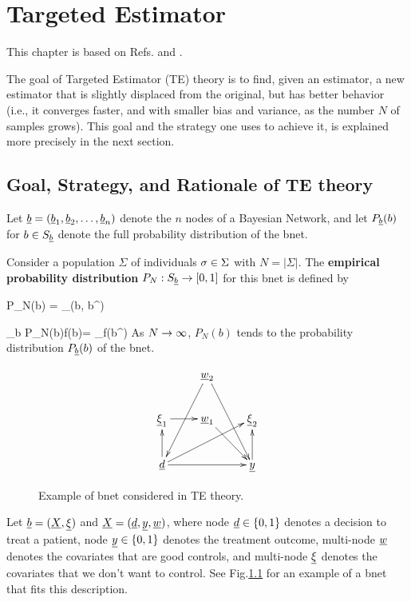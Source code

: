\chapter{Targeted Estimator}
\label{ch-targeted-est}

\newcommand{\dpsi}[0]{\nabla\Psi}
\newcommand{\hatl}[0]{\hat{\call}}

This chapter is based on Refs.\cite{tlride} and  \cite{hoff}.

The goal of Targeted Estimator (TE) theory is
to find, given an estimator,
a new estimator that is slightly
displaced from the original,
but has better behavior (i.e.,
it converges faster, and with smaller
bias and variance, as the number $N$
of samples grows). This goal and
the strategy one uses to achieve it, is
explained more precisely in the next section.




\section{Goal, Strategy, and Rationale of TE theory}


Let ${\underline{b}} = ({\underline{b}}_1, {\underline{b}}_2, \ldots, {\underline{b}}_{n})$ denote
the $n$ nodes of a Bayesian Network, and let $P_{\underline{b}}(b)$ for $b\in S_{\underline{b}}$
denote the full probability distribution of the bnet.

 Consider a population $\Sigma$ of
 individuals $\sigma\in \Sigma$ with $N=|\Sigma|$.
 The {\bf empirical probability distribution}
 $P_N:S_{\underline{b}} \rightarrow [0,1]$ for this bnet is defined by

\beq
P_N(b) = \sum_\s\delta(b, b^\s)
\eeq

\beq
\sum_b P_N(b)f(b)=
\sum_\s f(b^\s)
\eeq
As $N\rightarrow \infty$, $P_N(b)$ tends
to the probability distribution $P_{\underline{b}}(b)$
of the bnet.
\begin{figure}[h!]
$$
\xymatrix{
&\rvw_2\ar[ddl]\ar[ddr]
\\
\ul{\xi}_1\ar[r]
&\rvw_1\ar[dr]
&\ul{\xi}_2
\\
\rvd\ar[rr]\ar[u]\ar[rru]
&
&\rvy\ar[u]
}
$$
\caption{Example of bnet considered in TE
theory.}
\label{fig-targeted-bnet}
\end{figure}

Let ${\underline{b}}=({\underline{X}}, \underline{\xi})$ and
${\underline{X}}=({\underline{d}}, {\underline{y}},{\underline{w}})$,
where
node ${\underline{d}}\in\{0,1\}$ denotes a decision to treat a patient,
node ${\underline{y}}\in \{0,1\}$ denotes the treatment outcome,
multi-node ${\underline{w}}$ denotes the covariates
that are good controls, and multi-node $\underline{\xi}$ denotes
the covariates that we don't want to control.
See Fig.\ref{fig-targeted-bnet}
for an example of a bnet that fits this description.


